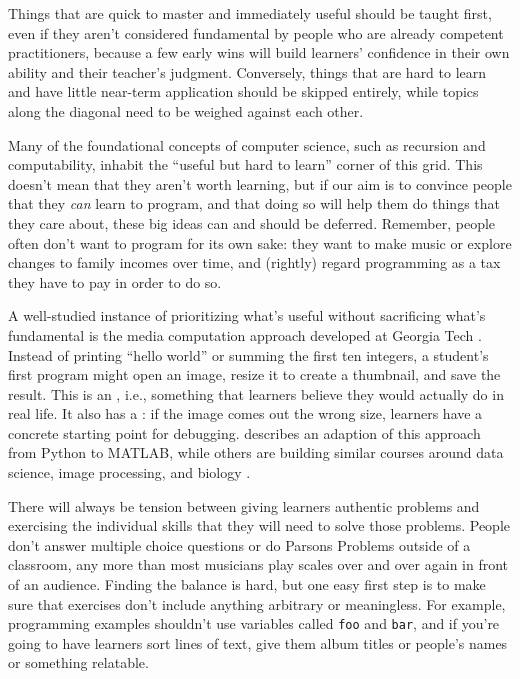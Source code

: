 
Things that are quick to master and immediately useful should be taught
first, even if they aren't considered fundamental by people who are
already competent practitioners, because a few early wins will build
learners' confidence in their own ability and their teacher's judgment.
Conversely, things that are hard to learn and have little near-term
application should be skipped entirely, while topics along the diagonal
need to be weighed against each other.

Many of the foundational concepts of computer science, such as recursion
and computability, inhabit the ``useful but hard to learn'' corner of this
grid. This doesn't mean that they aren't worth learning, but if our aim
is to convince people that they \emph{can} learn to program, and that doing
so will help them do things that they care about, these big ideas can
and should be deferred. Remember, people often don't want to program for
its own sake: they want to make music or explore changes to family
incomes over time, and (rightly) regard programming as a tax they have
to pay in order to do so.

A well-studied instance of prioritizing what's useful without
sacrificing what's fundamental is the media computation approach
developed at Georgia Tech \cite{Guzd2013}. Instead of printing ``hello
world'' or summing the first ten integers, a student's first program
might open an image, resize it to create a thumbnail, and save the
result. This is an , i.e.,
something that learners believe they would actually do in real life. It
also has a : if the
image comes out the wrong size, learners have a concrete starting point
for debugging. \cite{Lee2013} describes an adaption of this approach
from Python to MATLAB, while others are building similar courses around
data science, image processing, and biology
\cite{Dahl2018,Meys2018,Ritz2018}.

There will always be tension between giving learners authentic problems
and exercising the individual skills that they will need to solve those
problems. People don't answer multiple choice questions or do Parsons
Problems outside of a classroom, any more than most musicians play
scales over and over again in front of an audience. Finding the balance
is hard, but one easy first step is to make sure that exercises don't
include anything arbitrary or meaningless. For example, programming
examples shouldn't use variables called \texttt{foo} and \texttt{bar}, and if you're
going to have learners sort lines of text, give them album titles or
people's names or something relatable.

